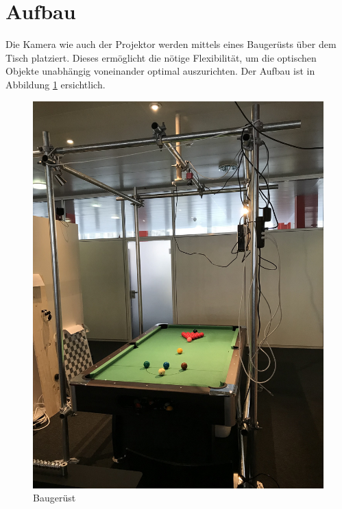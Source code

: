 \section{Aufbau}

Die Kamera wie auch der Projektor werden mittels eines Baugerüsts über dem Tisch platziert. Dieses ermöglicht die nötige
Flexibilität, um die optischen Objekte unabhängig voneinander optimal auszurichten.
Der Aufbau ist in Abbildung \ref{fig:construction} ersichtlich.

\begin{figure}[h!]
    \begin{center}
        \includegraphics[width=0.6\linewidth]{../common/resources/construction/table.jpg}
    \end{center}
    \caption{Baugerüst}
    \label{fig:construction}
\end{figure}




